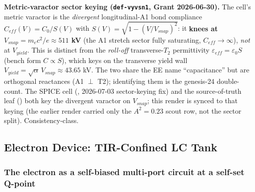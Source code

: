 \noindent\textbf{Metric-varactor sector keying (\texttt{def-vyvsn1}, Grant 2026-06-30).} The cell's metric varactor is the \emph{divergent} longitudinal-A1 bond compliance $C_{eff}(V) = C_0/S(V)$ with $S(V) = \sqrt{1-(V/V_{snap})^2}$: it \textbf{knees at $V_{snap} = m_ec^2/e \approx 511$ kV} (the A1 stretch sector fully saturating, $C_{eff}\to\infty$), \emph{not} at $V_{yield}$. This is distinct from the \emph{roll-off} transverse-$T_2$ permittivity $\varepsilon_{eff}=\varepsilon_0 S$ (bench form $C\propto S$), which keys on the transverse yield wall $V_{yield}=\sqrt\alpha\,V_{snap}\approx43.65$ kV. The two share the EE name ``capacitance'' but are orthogonal reactances (A1 $\perp$ T2); identifying them is the genesis-24 double-count. The SPICE cell (, 2026-07-03 sector-keying fix) and the source-of-truth leaf () both key the divergent varactor on $V_{snap}$; this render is synced to that keying (the earlier render carried only the $A^2{=}0.23$ scout row, not the sector split). Consistency-class.

\subsection{Electron Device: TIR-Confined LC Tank}
\label{sec:vol9_electron_device_circuit}



\subsubsection{The electron as a self-biased multi-port circuit at a self-set Q-point}
\label{subsec:vol9_electron_selfbiased_multiport}

